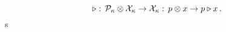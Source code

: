 \begin{equation}\triangleright :\, {\cal{P}}_\kappa\otimes
{\cal{X}}_\kappa\rightarrow {\cal{X}}_\kappa :\, p\otimes
x\rightarrow p\triangleright x\, .\label{r313}\end{equation}s
